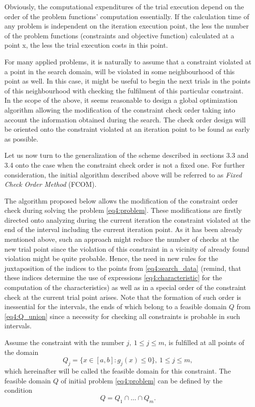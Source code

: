 Obviously, the computational expenditures of the trial execution depend on the order of the problem functions’ computation essentially. If the calculation time of any problem is independent on the iteration execution point, the less the number of the problem functions (constraints and objective function) calculated at a point x, the less the trial execution costs in this point.

For many applied problems, it is naturally to assume that a constraint violated at a point in the search domain, will be violated in some neighbourhood of this point as well. In this case, it might be useful to begin the next trials in the points of this neighbourhood with checking the fulfilment of this particular constraint. In the scope of the above, it seems reasonable to design a global optimization algorithm allowing the modification of the constraint  check order taking into account the information obtained during the search. The check order design will be oriented onto the constraint violated at an iteration point to be found as early as possible.

Let us now turn to the generalization of the scheme described in sections 3.3 and 3.4 onto the case when the constraint check order is not a fixed one. For further consideration, the initial algorithm described above will be referred to as \emph{Fixed Check Order Method} (FCOM).

The algorithm proposed below allows the modification of the constraint order check during solving the problem \eqref{eq4:problem}. These modifications are firstly directed onto analyzing during the current iteration the constraint violated at the end of the interval including the current iteration point. As it has been already mentioned above, such an approach might reduce the number of checks at the new trial point since the violation of this constraint in a vicinity of already found violation might be quite probable. Hence, the need in new rules for the juxtaposition of the indices to the points from \eqref{eq4:search_data} (remind, that these indices determine the use of expressions \eqref{eq4:characteristic} for the computation of the characteristics) as well as in a special order
of the constraint check at the current trial point arises. Note that the formation of such order is inessential for the intervals, the ends of which belong to a feasible domain $Q$ from \eqref{eq4:Q_union} since a necessity for checking all constraints is probable in such intervals.

Assume the constraint with the number $j,\: 1\le j\le m$, is fulfilled at all points of the domain
\begin{equation}
  Q_j=\{x\in[a,b]:g_j(x)\le 0\},\: 1\le j\le m,
\end{equation}
which hereinafter will be called the feasible domain for this constraint. The feasible domain $Q$ of initial problem \eqref{eq4:problem} can be defined by the condition
\begin{equation}
  \label{eq4:Q_union}
  Q=Q_1\cap\dots\cap Q_m.
\end{equation}

